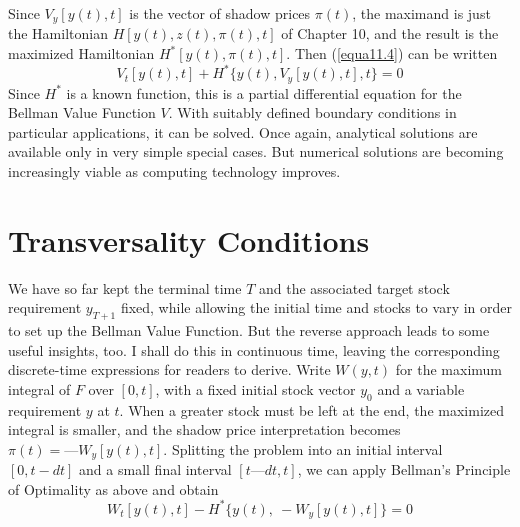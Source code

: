 Since $V_y[y(t),t]$ is the vector of shadow prices $\pi(t)$, the maximand is just the Hamiltonian $H[y(t), z(t), \pi(t), t]$ of Chapter 10, and the result is the maximized Hamiltonian $H^*[y(t), \pi(t), t]$. Then (\ref{equa11.4}) can be written
\begin{equation} \label{equa11.6}
V_t[y(t),t] + H^*\{y(t), V_y[y(t),t],t \} =0
\end{equation}
Since $H^*$ is a known function, this is a partial differential equation for the Bellman Value Function $V$. With suitably defined boundary conditions in particular applications, it can be solved. Once again, analytical solutions are available only in very simple special cases. But numerical solutions are becoming increasingly viable as computing technology improves.

\section*{Transversality Conditions}

We have so far kept the terminal time $T$ and the associated target stock requirement $y_{T+1}$ fixed, while allowing the initial time and stocks to vary in order to set up the Bellman Value Function. But the reverse approach leads to some useful insights, too. I shall do this in continuous time, leaving the corresponding discrete-time expressions for readers to derive. Write $W(y, t)$ for the maximum integral of $F$ over $[0,t]$, with a fixed initial stock vector $y_0$ and a variable requirement $y$ at $t$. When a greater stock must be left at the end, the maximized integral is smaller, and the shadow price interpretation becomes $\pi(t) = — W_y[y(t),t]$. Splitting the problem into an initial interval $[0,t - dt]$ and a small final interval $[t — dt, t]$, we can apply Bellman's Principle of Optimality as above and obtain
\begin{equation} \label{equa11.7}
 W_t[y(t), t] - H^* \{ y(t), \ -W_y[y(t),t] \} = 0
\end{equation}

